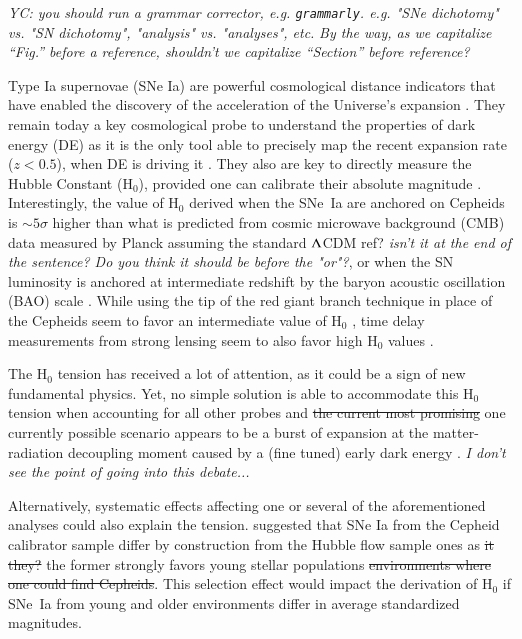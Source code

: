 \documentclass[]{aa} %
\newcommand{\nn}[1]{{\textcolor[rgb]{0.25, 0.50, 0}{#1}}}
\newcommand{\yc}[1]{{\textcolor{BrickRed}{#1}}}
\begin{document}
\yc{\textit{YC: you should run a grammar corrector, e.g. \texttt{grammarly}.
e.g. "SNe dichotomy" vs. "SN dichotomy", "analysis" vs. "analyses", etc.}}
\nn{\textit{By the way, as we capitalize ``Fig.'' before a reference, shouldn't
we capitalize ``Section'' before reference?}}

Type Ia supernovae (SNe Ia) are powerful cosmological distance indicators that
have enabled the discovery of the acceleration of the Universe's expansion
\citep{riess1998, perlmutter1999}. They remain today a key cosmological probe to
understand the properties of dark energy (DE) as it is the only tool able to
precisely map the recent expansion rate ($z<0.5$), when DE is driving it
\citep[e.g.][]{scolnicastro2020}. They also are key to directly measure the
Hubble Constant (H$_0$), provided one can calibrate their absolute magnitude
\citep{riess2016, freedman2019}. Interestingly, the value of H$_0$ derived when
the SNe~Ia are anchored on Cepheids \citep[the SH0ES
project,][]{riess2009,riess2016} is $\sim5\sigma$ higher than what is predicted
\yc{from} cosmic microwave background (CMB) data measured by Planck assuming the
standard $\Lambda$CDM \yc{ref?} \nn{\textit{isn't it at the end of the sentence? Do
you think it should be before the "or"?}}, or when the SN luminosity is anchored
at intermediate redshift by the baryon acoustic oscillation (BAO) scale
\citep{riess2019,reid2019,planck2018, feeney2019}. While using the tip of the
red giant branch technique in place of the Cepheids seem to favor an
intermediate value of H$_0$ \citep{freedman2019,freedman2020}, time delay
measurements from strong lensing seem to also favor high H$_0$ values
\citep{wong2019}.

The H$_0$ tension has received a lot of attention, as it could be a sign of new
fundamental physics. Yet, no simple solution is able to accommodate this H$_0$
tension when accounting for all other probes \citep{knox2019} and \nn{\sout{the
current most promising}} \nn{one currently possible} scenario appears to be a
burst of expansion at the matter-radiation decoupling moment caused by a (fine
tuned) early dark energy \citep{poulin2019}. \yc{\textit{I don't see the point
of going into this debate...}}

Alternatively, systematic effects affecting one or several of the aforementioned
analyses could also explain the tension. \cite{rigault2015} suggested that SNe
Ia from the Cepheid calibrator sample differ by construction from the Hubble
flow \nn{sample} ones as \nn{\sout{it \yc{they?}}} \nn{the former} strongly
favors young stellar population\nn{s} \nn{\sout{environments where one could
find Cepheids}}. This selection effect would impact the derivation of H$_0$ if
SNe~Ia from young and older environments differ in average standardized
magnitudes. 
\end{document}
